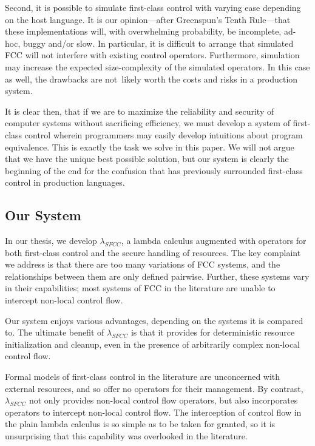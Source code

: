 \documentclass[11pt]{article}
\newcommand{\maybePage}{\newpage}
\begin{document}
Second, it is possible to simulate first-class control with varying ease depending on the host language.
It is our opinion---after Greenspun's Tenth Rule---that these implementations will, with overwhelming probability, be incomplete, ad-hoc, buggy and/or slow.
In particular, it is difficult to arrange that simulated FCC will not interfere with existing control operators.\cite{addDelimControlProduction}
Furthermore, simulation may increase the expected size-complexity of the simulated operators.\cite{finalShiftForCallcc}
In this case as well, the drawbacks are not~likely worth the costs and risks in a production system.



It is clear then, that if we are to maximize the reliability and security of computer systems without sacrificing efficiency, we must develop a system of first-class control wherein programmers may easily develop intuitions about program equivalence.
This is exactly the task we solve in this paper.
We will not argue that we have the unique best possible solution, but our system is clearly the beginning of the end for the confusion that has previously surrounded first-class control in production languages.

\maybePage
\subsection{Our System}

In our thesis, we develop $\lambda_{SFCC}$, a lambda calculus augmented with operators for both first-class control and the secure handling of resources.
The key complaint we address is that there are too many variations of FCC systems, and the relationships between them are only defined pairwise.
Further, these systems vary in their capabilities; most systems of FCC in the literature are unable to intercept non-local control flow.

Our system enjoys various advantages, depending on the systems it is compared to.
The ultimate benefit of $\lambda_{SFCC}$ is that it provides for deterministic resource initialization and cleanup, even in the presence of arbitrarily complex non-local control flow.

Formal models of first-class control in the literature are unconcerned with external resources, and so offer no operators for their management.
By contrast, $\lambda_{SFCC}$ not only provides non-local control flow operators, but also incorporates operators to intercept non-local control flow.
The interception of control flow in the plain lambda calculus is so simple as to be taken for granted, so it is unsurprising that this capability was overlooked in the literature.
\end{document}

